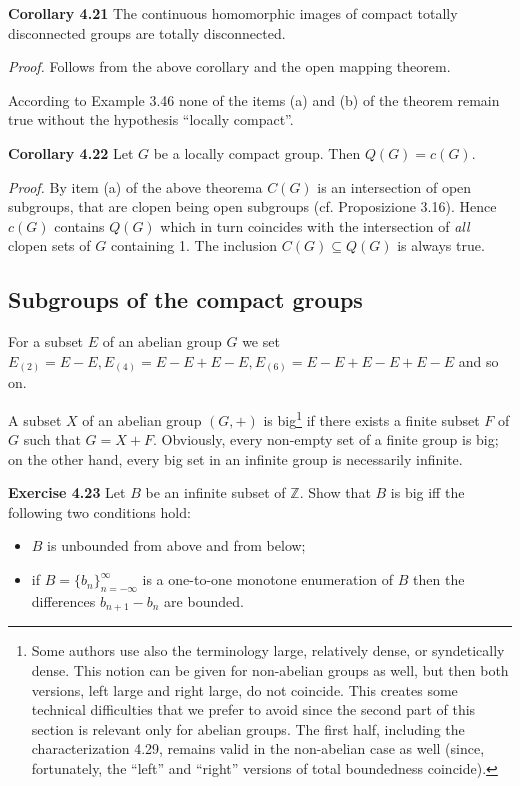 \documentclass[12pt]{article}
\begin{document}
\textbf{Corollary 4.21} The continuous homomorphic images of compact totally disconnected groups are totally disconnected.


    \emph{Proof.} Follows from the above corollary and the open mapping theorem.


    According to Example 3.46 none of the items (a) and (b) of the theorem remain true without the hypothesis
“locally compact”.


\textbf{Corollary 4.22} Let $G$ be a locally compact group. Then $Q(G) = c(G)$.


    \emph{Proof.} By item (a) of the above theorema $C(G)$ is an intersection of open subgroups, that are clopen being open
subgroups (cf. Proposizione 3.16). Hence $c(G)$ contains $Q(G)$ which in turn coincides with the intersection of
\emph{all} clopen sets of $G$ containing 1. The inclusion $C(G) \subseteq Q(G)$ is always true.


\subsection{Subgroups of the compact groups}
For a subset $E$ of an abelian group $G$ we set $E_{(2)} = E - E, E_{(4)} = E - E + E - E, E_{(6)} = E - E + E - E + E - E$
and so on.


    A subset $X$ of an abelian group $(G, +)$ is big\footnote[10]{Some authors use also the terminology large, relatively dense, or syndetically dense. This notion can be given for non-abelian
groups as well, but then both versions, left large and right large, do not coincide. This creates some technical difficulties that we
prefer to avoid since the second part of this section is relevant only for abelian groups. The first half, including the characterization
4.29, remains valid in the non-abelian case as well (since, fortunately, the “left” and “right” versions of total boundedness coincide).}
if there exists a finite subset $F$ of $G$ such that $G = X + F$.
Obviously, every non-empty set of a finite group is big; on the other hand, every big set in an infinite group is
necessarily infinite.


\textbf{Exercise 4.23} Let $B$ be an infinite subset of $\mathbb{Z}$. Show that $B$ is big iff the following two conditions hold:


\begin{itemize}

    \item $B$ is unbounded from above and from below;

    \item  if $B = \{b_n\}^{\infty}_{n=-\infty}$ is a one-to-one monotone enumeration of $B$ then the differences $b_{n+1} - b_n$ are bounded.

\end{itemize}
\end{document}
